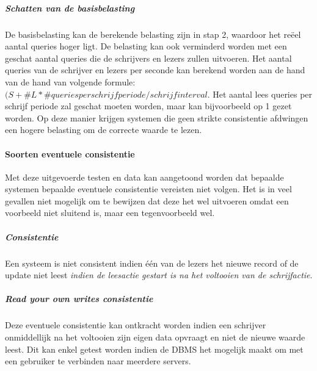 \subparagraph{Schatten van de basisbelasting} De basisbelasting kan de berekende belasting zijn in stap 2, waardoor het reëel aantal queries hoger ligt. De belasting kan ook verminderd worden met een geschat aantal queries die de schrijvers en lezers zullen uitvoeren. Het aantal queries van de schrijver en lezers per seconde kan berekend worden aan de hand van de hand van volgende formule: $(S + \#L*\#queriesperschrijfperiode / schrijfinterval$. Het aantal lees queries per schrijf periode zal geschat moeten worden, maar kan bijvoorbeeld op 1 gezet worden. Op deze manier krijgen systemen die geen strikte consistentie afdwingen een hogere belasting om de correcte waarde te lezen. 

\paragraph{Soorten eventuele consistentie} Met deze uitgevoerde testen en data kan aangetoond worden dat bepaalde systemen bepaalde eventuele consistentie vereisten niet volgen. Het is in veel gevallen niet mogelijk om te bewijzen dat deze het wel uitvoeren omdat een voorbeeld niet sluitend is, maar een tegenvoorbeeld wel. 

\subparagraph{Consistentie} Een systeem is niet consistent indien één van de lezers het nieuwe record of de update niet leest \textit{indien de leesactie gestart is na het voltooien van de schrijfactie}.


\subparagraph{Read your own writes consistentie} Deze eventuele consistentie kan ontkracht worden indien een schrijver onmiddellijk na het voltooien zijn eigen data opvraagt en niet de nieuwe waarde leest. Dit kan enkel getest worden indien de DBMS het mogelijk maakt om met een gebruiker te verbinden naar meerdere servers. 

